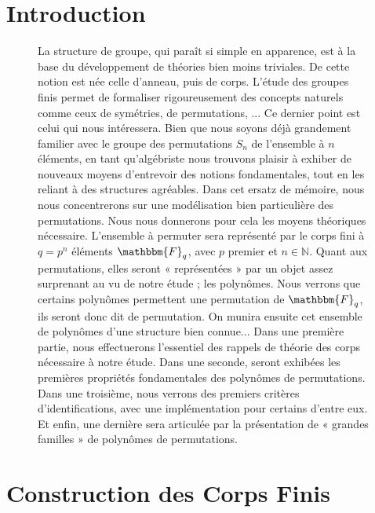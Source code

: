 \documentclass[12pt]{article}
\newcommand{\Fq}{\mathbbm{F}_q}
\theoremstyle{definition}
\begin{document}
\section*{Introduction}
\begin{figure}[h]
La structure de groupe, qui paraît si simple en apparence, est à la base du développement de théories bien moins triviales. De cette notion est née celle d’anneau, puis de corps. L’étude des groupes finis permet de formaliser rigoureusement des concepts naturels comme ceux de symétries, de permutations, ... Ce dernier point est celui qui nous intéressera. Bien que nous soyons déjà grandement familier avec le groupe des permutations $S_n$ de l’ensemble à $n$ éléments, en tant qu’algébriste nous trouvons plaisir à exhiber de nouveaux moyens d'entrevoir des notions fondamentales, tout en les reliant à des structures agréables. \newline
Dans cet ersatz de mémoire, nous nous concentrerons sur une modélisation bien particulière des permutations. \newline
Nous nous donnerons pour cela les moyens théoriques nécessaire. L’ensemble à permuter sera représenté par le corps fini à $q = p^n$ éléments $\Fq$, avec $p$ premier et $n \in \mathbb{N}$. Quant aux permutations, elles seront « représentées » par un objet assez surprenant au vu de notre étude ; les polynômes. Nous verrons que certains polynômes permettent une permutation de $\Fq$, ils seront donc dit de permutation. On munira ensuite cet ensemble de polynômes d'une structure bien connue...\newline
\break
Dans une première partie, nous effectuerons l’essentiel des rappels de théorie des corps nécessaire à notre étude. Dans une seconde, seront exhibées les premières propriétés fondamentales des polynômes de permutations. Dans une troisième, nous verrons des premiers critères d’identifications, avec une implémentation pour certains d'entre eux. Et enfin, une dernière sera articulée par la présentation de « grandes familles » de polynômes de permutations.
\end{figure}

\vfill \eject


\pagebreak 



\section{Construction des Corps Finis}
\end{document}

